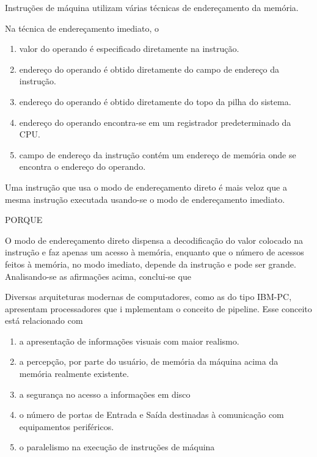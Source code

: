 \documentclass[aspectratio=169,
				xcolor=table]{beamer}
\begin{document}
	\begin{frame}
		Instruções de máquina utilizam várias técnicas de endereçamento da memória. 

		Na técnica de endereçamento imediato, o
	
		\begin{enumerate}[a]
			\normalsize
			\item valor do operando é especificado diretamente na instrução.
			\item endereço do operando é obtido diretamente do campo de endereço da instrução.
			\item endereço do operando é obtido diretamente do topo da pilha do sistema.
			\item endereço do operando encontra-se em um registrador predeterminado da CPU.
			\item campo de endereço da instrução contém um endereço de memória onde se encontra o endereço do operando.
		
		\end{enumerate}
	\end{frame}
	
	\begin{frame}
	Uma instrução que usa o modo de endereçamento direto é mais veloz que a mesma instrução executada usando-se o modo de endereçamento imediato.

\begin{center}
PORQUE
\end{center}                                                 

O modo de endereçamento direto dispensa a decodificação do valor colocado na instrução e faz apenas um acesso à memória, enquanto que o número de acessos feitos à memória, no modo imediato, depende da instrução e pode ser grande.
Analisando-se as afirmações acima, conclui-se que
	\end{frame}

	\begin{frame}
		Diversas arquiteturas modernas de computadores, como as do tipo IBM-PC, apresentam processadores que i mplementam o conceito de pipeline. Esse conceito está relacionado com
		
		\vspace{1em}
		\begin{enumerate}[a]
			\normalsize
			\item a apresentação de informações visuais com maior realismo.
			\item a percepção, por parte do usuário, de memória da máquina acima da memória realmente existente.
			\item  a segurança no acesso a informações em disco
			\item  o número de portas de Entrada e Saída destinadas à comunicação com equipamentos periféricos.
			\item  o paralelismo na execução de instruções de máquina
		
		\end{enumerate}

	\end{frame}
	
\end{document}
